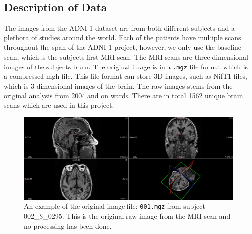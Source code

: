 \documentclass[12pt, fleqn, titlepage]{article}
\begin{document}
\subsection{Description of Data} \label{dataDescription}


The images from the ADNI 1 dataset are from both different subjects and a plethora of studies around the world. 
Each of the patients have multiple scans throughout the span of the ADNI 1 project, however, we only use the baseline scan, which is the subjects first MRI-scan. 
The MRI-scans are three dimensional images of the subjects brain. 
The original image is in a \texttt{.mgz} file format which is a compressed mgh file. 
This file format can store 3D-images, such as NifT1 files, which is 3-dimensional images of the brain. 
The raw images stems from the original analysis from 2004 and on wards. 
There are in total 1562 %
unique brain scans which are used in this project.

\begin{figure}[H]
	\centering
	\includegraphics[width=0.95\linewidth]{mymans2}
	\caption{An example of the original image file: \texttt{001.mgz} from subject 002\_S\_0295. This is the original raw image from the MRI-scan and no processing has been done.}
	\label{fig:screenshot001}
\end{figure}



\end{document}
